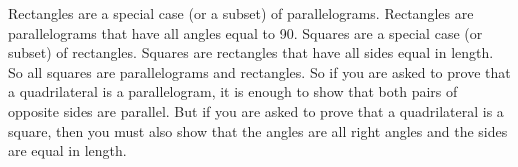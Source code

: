 \label{m39354*id9732}Rectangles are a special case (or a subset) of parallelograms. Rectangles are parallelograms that have all angles equal to 90. Squares are a special case (or subset) of rectangles. Squares are rectangles that have all sides equal in length. So all squares are parallelograms and rectangles. So if you are asked to prove that a quadrilateral is a parallelogram, it is enough to show that both pairs of opposite sides are parallel. But if you are asked to prove that a quadrilateral is a square, then you must also show that the angles are all right angles and the sides are equal in length.
\par 
%       
%             
%       
%             
%         
%             
%         
